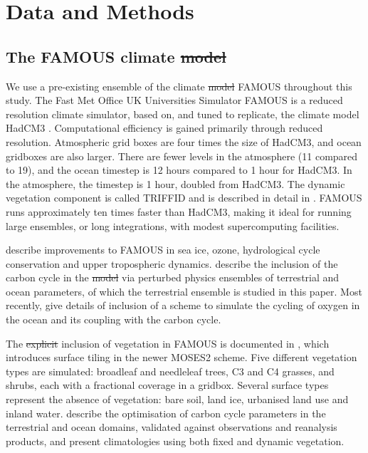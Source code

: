 \documentclass[esd, manuscript]{copernicus}
\providecommand{\DIFadd}[1]{{\protect\color{blue}\uwave{#1}}} %
\providecommand{\DIFdel}[1]{{\protect\color{red}\sout{#1}}}                      %
\providecommand{\DIFaddbegin}{} %
\providecommand{\DIFaddend}{} %
\providecommand{\DIFdelbegin}{} %
\providecommand{\DIFdelend}{} %
\begin{document}
\section{Data and Methods}\label{sec:dataandmethods}

\subsection{The FAMOUS climate \DIFdelbegin \DIFdel{model}\DIFdelend \DIFaddbegin \DIFadd{simulator}\DIFaddend }\label{subsec:FAMOUS}

We use a pre-existing ensemble of the climate \DIFdelbegin \DIFdel{model }\DIFdelend \DIFaddbegin \DIFadd{simulator }\DIFaddend FAMOUS throughout this study. The Fast Met Office UK Universities Simulator FAMOUS \citep{jones2005systematic,smith2008famous} is a reduced resolution climate simulator, based on, and tuned to replicate, the climate model HadCM3 \citep{gordon2000simulation,pope2000impact}. Computational efficiency is gained primarily through reduced resolution. Atmospheric grid boxes are four times the size of HadCM3, and ocean gridboxes are also larger. There are fewer levels in the atmosphere (11 compared to 19), and the ocean timestep is 12 hours compared to 1 hour for HadCM3. In the atmosphere, the timestep is 1 hour, doubled from HadCM3. The dynamic vegetation component is called TRIFFID and is described in detail in \cite{cox2001description}. FAMOUS runs approximately ten times faster than HadCM3, making it ideal for running large ensembles, or long integrations, with modest supercomputing facilities.

\cite{smith2012famous} describe improvements to FAMOUS in sea ice, ozone, hydrological cycle conservation and upper tropospheric dynamics. \cite{williams2013optimising} describe the inclusion of the carbon cycle in the \DIFdelbegin \DIFdel{model }\DIFdelend \DIFaddbegin \DIFadd{simulator }\DIFaddend via perturbed physics ensembles of terrestrial and ocean parameters, of which the terrestrial ensemble is studied in this paper. Most recently, \cite{williams2014oxygen} give details of inclusion of a scheme to simulate the cycling of oxygen in the ocean and its coupling with the carbon cycle.

The \DIFdelbegin \DIFdel{explicit }\DIFdelend inclusion of vegetation in FAMOUS is documented in \cite{williams2013optimising}, which introduces surface tiling in the newer MOSES2 scheme. Five different vegetation types are simulated: broadleaf and needleleaf trees, C3 and C4 grasses, and shrubs, each with a fractional coverage in a gridbox. Several surface types represent the absence of vegetation: bare soil, land ice, urbanised land use and inland water. \cite{williams2013optimising} describe the optimisation of carbon cycle parameters in the terrestrial and ocean domains, validated against observations and reanalysis products, and present climatologies using both fixed and dynamic vegetation. 
\end{document}
